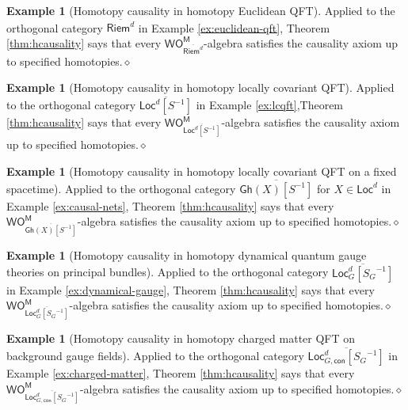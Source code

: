 \documentclass{amsbook}
\numberwithin{section}{chapter}
\numberwithin{subsection}{section}
\numberwithin{equation}{section}
\theoremstyle{plain}
\theoremstyle{definition}
\newtheorem{example}[equation]{Example}
\newcommand{\M}{\mathsf{M}}
\renewcommand{\O}{\mathsf{O}}
\newcommand{\Otom}{\O^{\M}}
\newcommand{\W}{\mathsf{W}}
\newcommand{\dqed}{\hfill$\diamond$}
\newcommand{\inv}[1]{{#1}^{-1}}
\newcommand{\Sinv}{\inv{S}}
\newcommand{\Bgloc}{\Locd_G}
\newcommand{\Bglocsginv}{\Bgloc[\inv{S_G}]}
\newcommand{\Bglocsginvbar}{\overline{\Bglocsginv}}
\newcommand{\Bgconloc}{\Locd_{G,\mathsf{con}}}
\newcommand{\Bgconlocsginv}{\Bgconloc[\inv{S_G}]}
\newcommand{\Bgconlocsginvbar}{\overline{\Bgconlocsginv}}
\newcommand{\Gh}{\mathsf{Gh}}
\newcommand{\Ghx}{\Gh(X)}
\newcommand{\Ghxsinvbar}{\overline{\Ghx[\Sinv]}}
\newcommand{\Loc}{\mathsf{Loc}}
\newcommand{\Locd}{\Loc^d}
\newcommand{\Locdsinv}{\Locd[\Sinv]}
\newcommand{\Locdsinvbar}{\overline{\Locdsinv}}
\newcommand{\Riem}{\mathsf{Riem}}
\newcommand{\Riemd}{\Riem^d}
\newcommand{\Riemdbar}{\overline{\Riemd}}
\newcommand{\wom}{\W\Otom}
\begin{document}
\begin{example}[Homotopy causality in homotopy Euclidean QFT]\label{ex:hcausality-euclidean}
Applied to the orthogonal category $\Riemdbar$ in Example \ref{ex:euclidean-qft}, Theorem \ref{thm:hcausality} says that every $\wom_{\Riemdbar}$-algebra satisfies the causality axiom up to specified homotopies.\dqed\end{example}

\begin{example}[Homotopy causality in homotopy locally covariant QFT]\label{ex:hcausality-lcqft}
Applied to the orthogonal category $\Locdsinvbar$ in Example \ref{ex:lcqft},Theorem \ref{thm:hcausality} says that every $\wom_{\Locdsinvbar}$-algebra satisfies the causality axiom up to specified homotopies.\dqed\end{example}

\begin{example}[Homotopy causality in homotopy locally covariant QFT on a fixed spacetime]\label{ex:hcausality-lcqft-fixed}
Applied to the orthogonal category $\Ghxsinvbar$ for $X \in \Locd$ in Example \ref{ex:causal-nets}, Theorem \ref{thm:hcausality} says that every $\wom_{\Ghxsinvbar}$-algebra satisfies the causality axiom up to specified homotopies.\dqed\end{example}

\begin{example}[Homotopy causality in homotopy dynamical quantum gauge theories on principal bundles]\label{ex:hcausality-dynamical}
Applied to the orthogonal category $\Bglocsginvbar$ in Example \ref{ex:dynamical-gauge}, Theorem \ref{thm:hcausality} says that every $\wom_{\Bglocsginvbar}$-algebra satisfies the causality axiom up to specified homotopies.\dqed\end{example}

\begin{example}[Homotopy causality in homotopy charged matter QFT on background gauge fields]\label{ex:hcausality-charged}
Applied to the orthogonal category $\Bgconlocsginvbar$ in Example \ref{ex:charged-matter}, Theorem \ref{thm:hcausality} says that every $\wom_{\Bgconlocsginvbar}$-algebra satisfies the causality axiom up to specified homotopies.\dqed\end{example}
\end{document}
